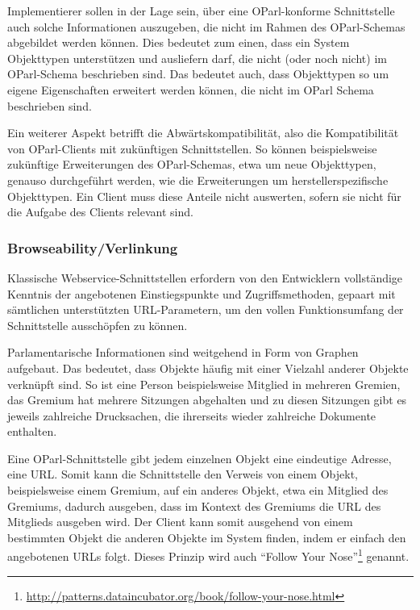 \documentclass[,a4paper]{article}
\begin{document}
Implementierer sollen in der Lage sein, über eine OParl-konforme
Schnittstelle auch solche Informationen auszugeben, die nicht im Rahmen
des OParl-Schemas abgebildet werden können. Dies bedeutet zum einen,
dass ein System Objekttypen unterstützen und ausliefern darf, die nicht
(oder noch nicht) im OParl-Schema beschrieben sind. Das bedeutet auch,
dass Objekttypen so um eigene Eigenschaften erweitert werden können, die
nicht im OParl Schema beschrieben sind.

Ein weiterer Aspekt betrifft die Abwärtskompatibilität, also die
Kompatibilität von OParl-Clients mit zukünftigen Schnittstellen. So
können beispielsweise zukünftige Erweiterungen des OParl-Schemas, etwa
um neue Objekttypen, genauso durchgeführt werden, wie die Erweiterungen
um herstellerspezifische Objekttypen. Ein Client muss diese Anteile
nicht auswerten, sofern sie nicht für die Aufgabe des Clients relevant
sind.

\subsubsection{Browseability/Verlinkung}\label{browseabilityux5fverlinkung}

Klassische Webservice-Schnittstellen erfordern von den Entwicklern
vollständige Kenntnis der angebotenen Einstiegspunkte und
Zugriffsmethoden, gepaart mit sämtlichen unterstützten URL-Parametern,
um den vollen Funktionsumfang der Schnittstelle ausschöpfen zu können.

Parlamentarische Informationen sind weitgehend in Form von Graphen
aufgebaut. Das bedeutet, dass Objekte häufig mit einer Vielzahl anderer
Objekte verknüpft sind. So ist eine Person beispielsweise Mitglied in
mehreren Gremien, das Gremium hat mehrere Sitzungen abgehalten und zu
diesen Sitzungen gibt es jeweils zahlreiche Drucksachen, die ihrerseits
wieder zahlreiche Dokumente enthalten.

Eine OParl-Schnittstelle gibt jedem einzelnen Objekt eine eindeutige
Adresse, eine URL. Somit kann die Schnittstelle den Verweis von einem
Objekt, beispielsweise einem Gremium, auf ein anderes Objekt, etwa ein
Mitglied des Gremiums, dadurch ausgeben, dass im Kontext des Gremiums
die URL des Mitglieds ausgeben wird. Der Client kann somit ausgehend von
einem bestimmten Objekt die anderen Objekte im System finden, indem er
einfach den angebotenen URLs folgt. Dieses Prinzip wird auch ``Follow
Your Nose''\footnote{\url{http://patterns.dataincubator.org/book/follow-your-nose.html}}
genannt.
\end{document}
